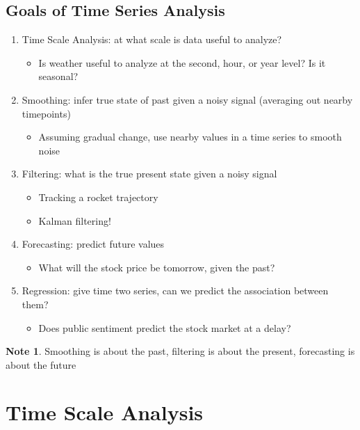 \documentclass[11pt]{article}
\theoremstyle{definition}
\newtheorem{note}{Note}
\begin{document}
\subsection{Goals of Time Series Analysis}
\begin{enumerate}
  \item Time Scale Analysis: at what scale is data useful to analyze?
  \begin{itemize}
    \item Is weather useful to analyze at the second, hour, or year level? Is it seasonal?
  \end{itemize}
  \item Smoothing: infer true state of past given a noisy signal (averaging out nearby timepoints)
  \begin{itemize}
    \item Assuming gradual change, use nearby values in a time series to smooth noise
  \end{itemize}
  \item Filtering: what is the true present state given a noisy signal
  \begin{itemize}
    \item Tracking a rocket trajectory
    \item Kalman filtering!
  \end{itemize}
  \item Forecasting: predict future values
  \begin{itemize}
    \item What will the stock price be tomorrow, given the past?
  \end{itemize}
  \item Regression: give time two series, can we predict the association between them?
  \begin{itemize}
    \item Does public sentiment predict the stock market at a delay?
  \end{itemize}
\end{enumerate}

\begin{note}
  Smoothing is about the past, filtering is about the present, forecasting is about the future
\end{note}

\section{Time Scale Analysis}
\end{document}
